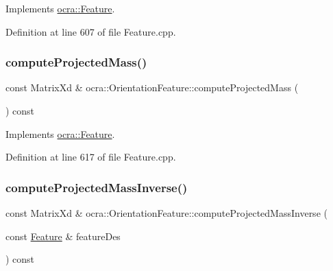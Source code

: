 Implements \hyperlink{classocra_1_1Feature_a44e11dd349e92971fefebff354e7214b}{ocra\+::\+Feature}.



Definition at line 607 of file Feature.\+cpp.

\hypertarget{classocra_1_1OrientationFeature_a6db043f4cce0767fe530c2e14aa9f48a}{}\label{classocra_1_1OrientationFeature_a6db043f4cce0767fe530c2e14aa9f48a} 
\subsubsection{\texorpdfstring{compute\+Projected\+Mass()}{computeProjectedMass()}\hspace{0.1cm}{\footnotesize\ttfamily [2/2]}}
{\footnotesize\ttfamily const Matrix\+Xd \& ocra\+::\+Orientation\+Feature\+::compute\+Projected\+Mass (\begin{DoxyParamCaption}{ }\end{DoxyParamCaption}) const\hspace{0.3cm}{\ttfamily [virtual]}}



Implements \hyperlink{classocra_1_1Feature_a99ac023809c0cf34b5d582537934b08c}{ocra\+::\+Feature}.



Definition at line 617 of file Feature.\+cpp.

\hypertarget{classocra_1_1OrientationFeature_ae5b32433e22fcea36c62b13811f8b5a0}{}\label{classocra_1_1OrientationFeature_ae5b32433e22fcea36c62b13811f8b5a0} 
\subsubsection{\texorpdfstring{compute\+Projected\+Mass\+Inverse()}{computeProjectedMassInverse()}\hspace{0.1cm}{\footnotesize\ttfamily [1/2]}}
{\footnotesize\ttfamily const Matrix\+Xd \& ocra\+::\+Orientation\+Feature\+::compute\+Projected\+Mass\+Inverse (\begin{DoxyParamCaption}\item[{const \hyperlink{classocra_1_1Feature}{Feature} \&}]{feature\+Des }\end{DoxyParamCaption}) const\hspace{0.3cm}{\ttfamily [virtual]}}



